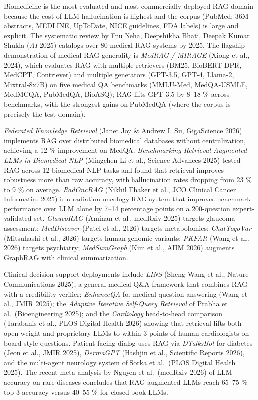 Biomedicine is the most evaluated and most commercially deployed RAG domain because the cost of LLM hallucination is highest and the corpus (PubMed: 36M abstracts, MEDLINE, UpToDate, NICE guidelines, FDA labels) is large and explicit. The systematic review by Fnu Neha, Deepshikha Bhati, Deepak Kumar Shukla (\emph{AI} 2025) catalogs over 80 medical RAG systems by 2025. The flagship demonstration of medical RAG generality is \emph{MedRAG / MIRAGE} (Xiong et al., 2024), which evaluates RAG with multiple retrievers (BM25, BioBERT-DPR, MedCPT, Contriever) and multiple generators (GPT-3.5, GPT-4, Llama-2, Mixtral-8x7B) on five medical QA benchmarks (MMLU-Med, MedQA-USMLE, MedMCQA, PubMedQA, BioASQ); RAG lifts GPT-3.5 by 8--18 \% across benchmarks, with the strongest gains on PubMedQA (where the corpus is precisely the test domain).

\emph{Federated Knowledge Retrieval} (Janet Joy \& Andrew I. Su, GigaScience 2026) implements RAG over distributed biomedical databases without centralization, achieving a 12 \% improvement on MedQA. \emph{Benchmarking Retrieval-Augmented LLMs in Biomedical NLP} (Mingchen Li et al., Science Advances 2025) tested RAG across 12 biomedical NLP tasks and found that retrieval improves robustness more than raw accuracy, with hallucination rates dropping from 23 \% to 9 \% on average. \emph{RadOncRAG} (Nikhil Thaker et al., JCO Clinical Cancer Informatics 2025) is a radiation-oncology RAG system that improves benchmark performance over LLM alone by 7--14 percentage points on a 200-question expert-validated set. \emph{GlaucoRAG} (Aminan et al., medRxiv 2025) targets glaucoma assessment; \emph{MedDiscover} (Patel et al., 2026) targets metabolomics; \emph{ChatTogoVar} (Mitsuhashi et al., 2026) targets human genomic variants; \emph{PKFAR} (Wang et al., 2026) targets psychiatry; \emph{MedSumGraph} (Kim et al., AIIM 2026) augments GraphRAG with clinical summarization.

Clinical decision-support deployments include \emph{LINS} (Sheng Wang et al., Nature Communications 2025), a general medical Q\&A framework that combines RAG with a credibility verifier; \emph{EnhanceQA} for medical question answering (Wang et al., JMIR 2025); the \emph{Adaptive Iterative Self-Query Retrieval} of Prabha et al.~(Bioengineering 2025); and the \emph{Cardiology} head-to-head comparison (Tarabanis et al., PLOS Digital Health 2026) showing that retrieval lifts both open-weight and proprietary LLMs to within 3 points of human cardiologists on board-style questions. Patient-facing dialog uses RAG via \emph{DTalksBot} for diabetes (Jeon et al., JMIR 2025), \emph{DermaGPT} (Hashjin et al., Scientific Reports 2026), and the multi-agent neurology system of Sorka et al.~(PLOS Digital Health 2025). The recent meta-analysis by Nguyen et al.~(medRxiv 2026) of LLM accuracy on rare diseases concludes that RAG-augmented LLMs reach 65--75 \% top-3 accuracy versus 40--55 \% for closed-book LLMs.

